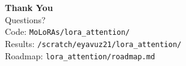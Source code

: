 \documentclass[aspectratio=169,10pt]{beamer}
\begin{document}
\begin{frame}[plain]
  \begin{center}
    \LARGE\textbf{Thank You}\\[1em]
    \large Questions?\\[2em]
    \normalsize
    \textcolor{myblue}{Code:} \texttt{MoLoRAs/lora\_attention/}\\[0.3em]
    \textcolor{myblue}{Results:} \texttt{/scratch/eyavuz21/lora\_attention/}\\[0.3em]
    \textcolor{myblue}{Roadmap:} \texttt{lora\_attention/roadmap.md}
  \end{center}
\end{frame}
\end{document}
